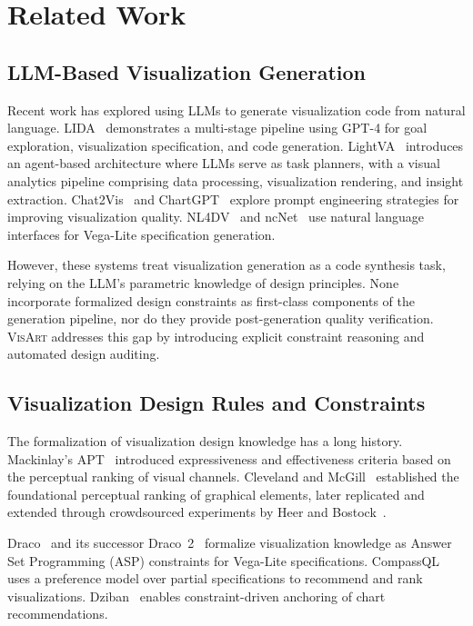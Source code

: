 \documentclass[journal]{vgtc}
\newcommand{\sysname}{\textsc{VisArt}}
\begin{document}
\section{Related Work}

\subsection{LLM-Based Visualization Generation}

Recent work has explored using LLMs to generate visualization code from natural language.
LIDA~\cite{dibia2023lida} demonstrates a multi-stage pipeline using GPT-4 for goal exploration, visualization specification, and code generation.
LightVA~\cite{li2024lightva} introduces an agent-based architecture where LLMs serve as task planners, with a visual analytics pipeline comprising data processing, visualization rendering, and insight extraction.
Chat2Vis~\cite{maddigan2023chat2vis} and ChartGPT~\cite{tian2024chartgpt} explore prompt engineering strategies for improving visualization quality.
NL4DV~\cite{narechania2020nl4dv} and ncNet~\cite{luo2022ncnet} use natural language interfaces for Vega-Lite specification generation.

However, these systems treat visualization generation as a code synthesis task, relying on the LLM's parametric knowledge of design principles.
None incorporate formalized design constraints as first-class components of the generation pipeline, nor do they provide post-generation quality verification.
\sysname{} addresses this gap by introducing explicit constraint reasoning and automated design auditing.

\subsection{Visualization Design Rules and Constraints}

The formalization of visualization design knowledge has a long history.
Mackinlay's APT~\cite{mackinlay1986automating} introduced expressiveness and effectiveness criteria based on the perceptual ranking of visual channels.
Cleveland and McGill~\cite{cleveland1984graphical} established the foundational perceptual ranking of graphical elements, later replicated and extended through crowdsourced experiments by Heer and Bostock~\cite{heer2010crowdsourcing}.

Draco~\cite{moritz2018formalizing} and its successor Draco~2~\cite{zeng2023draco2} formalize visualization knowledge as Answer Set Programming (ASP) constraints for Vega-Lite specifications.
CompassQL~\cite{wongsuphasawat2016towards} uses a preference model over partial specifications to recommend and rank visualizations.
Dziban~\cite{lin2020dziban} enables constraint-driven anchoring of chart recommendations.
\end{document}
